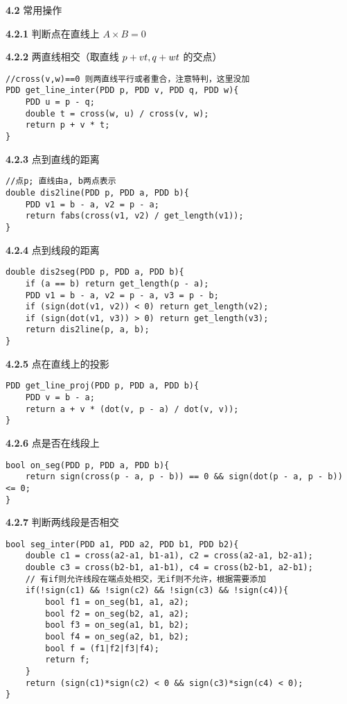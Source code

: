 \documentclass[12pt]{article}
\begin{document}
\textbf{4.2} 常用操作

\textbf{4.2.1} 判断点在直线上 $A\times B=0$

\textbf{4.2.2} 两直线相交（取直线 $p+vt,\space q+wt$ 的交点）

\begin{lstlisting}[style=C++]
//cross(v,w)==0 则两直线平行或者重合，注意特判，这里没加
PDD get_line_inter(PDD p, PDD v, PDD q, PDD w){
	PDD u = p - q;
	double t = cross(w, u) / cross(v, w);
	return p + v * t;
}
\end{lstlisting}

\textbf{4.2.3} 点到直线的距离

\begin{lstlisting}[style=C++]
//点p; 直线由a, b两点表示
double dis2line(PDD p, PDD a, PDD b){
	PDD v1 = b - a, v2 = p - a;
	return fabs(cross(v1, v2) / get_length(v1));
}
\end{lstlisting}

\textbf{4.2.4} 点到线段的距离

\begin{lstlisting}[style=C++]
double dis2seg(PDD p, PDD a, PDD b){
	if (a == b) return get_length(p - a);
	PDD v1 = b - a, v2 = p - a, v3 = p - b;
	if (sign(dot(v1, v2)) < 0) return get_length(v2);
	if (sign(dot(v1, v3)) > 0) return get_length(v3);
	return dis2line(p, a, b);
}
\end{lstlisting}

\textbf{4.2.5} 点在直线上的投影

\begin{lstlisting}[style=C++]
PDD get_line_proj(PDD p, PDD a, PDD b){
	PDD v = b - a;
	return a + v * (dot(v, p - a) / dot(v, v));
}
\end{lstlisting}

\textbf{4.2.6} 点是否在线段上

\begin{lstlisting}[style=C++]
bool on_seg(PDD p, PDD a, PDD b){
	return sign(cross(p - a, p - b)) == 0 && sign(dot(p - a, p - b)) <= 0;
}
\end{lstlisting}

\textbf{4.2.7} 判断两线段是否相交

\begin{lstlisting}[style=C++]
bool seg_inter(PDD a1, PDD a2, PDD b1, PDD b2){
	double c1 = cross(a2-a1, b1-a1), c2 = cross(a2-a1, b2-a1);
	double c3 = cross(b2-b1, a1-b1), c4 = cross(b2-b1, a2-b1);
	// 有if则允许线段在端点处相交，无if则不允许，根据需要添加
	if(!sign(c1) && !sign(c2) && !sign(c3) && !sign(c4)){
		bool f1 = on_seg(b1, a1, a2);
		bool f2 = on_seg(b2, a1, a2);
		bool f3 = on_seg(a1, b1, b2);
		bool f4 = on_seg(a2, b1, b2);
		bool f = (f1|f2|f3|f4);
		return f;
	}
	return (sign(c1)*sign(c2) < 0 && sign(c3)*sign(c4) < 0);
}
\end{lstlisting}
\end{document}
